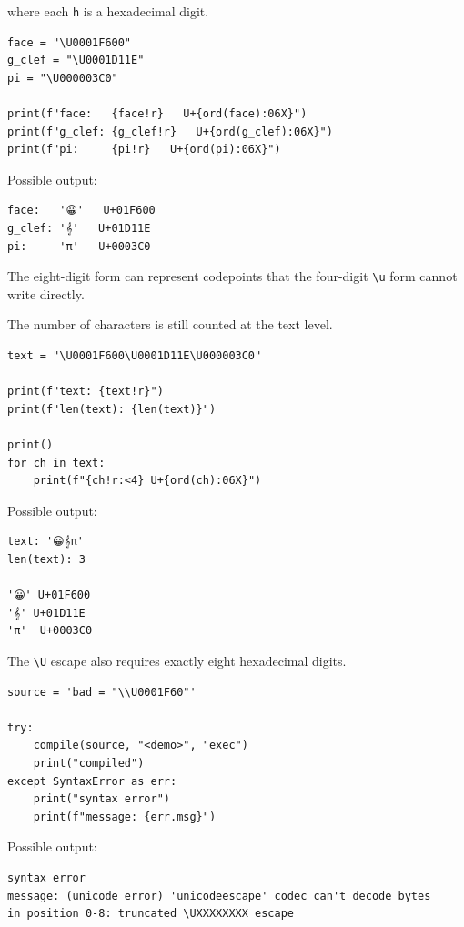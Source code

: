where each \texttt{h} is a hexadecimal digit.

\begin{verbatim}
face = "\U0001F600"
g_clef = "\U0001D11E"
pi = "\U000003C0"

print(f"face:   {face!r}   U+{ord(face):06X}")
print(f"g_clef: {g_clef!r}   U+{ord(g_clef):06X}")
print(f"pi:     {pi!r}   U+{ord(pi):06X}")
\end{verbatim}

Possible output:

\begin{verbatim}
face:   '😀'   U+01F600
g_clef: '𝄞'   U+01D11E
pi:     'π'   U+0003C0
\end{verbatim}

The eight-digit form can represent codepoints that the four-digit \texttt{\textbackslash u} form cannot write directly.

The number of characters is still counted at the text level.

\begin{verbatim}
text = "\U0001F600\U0001D11E\U000003C0"

print(f"text: {text!r}")
print(f"len(text): {len(text)}")

print()
for ch in text:
    print(f"{ch!r:<4} U+{ord(ch):06X}")
\end{verbatim}

Possible output:

\begin{verbatim}
text: '😀𝄞π'
len(text): 3

'😀' U+01F600
'𝄞' U+01D11E
'π'  U+0003C0
\end{verbatim}

The \texttt{\textbackslash U} escape also requires exactly eight hexadecimal digits.

\begin{verbatim}
source = 'bad = "\\U0001F60"'

try:
    compile(source, "<demo>", "exec")
    print("compiled")
except SyntaxError as err:
    print("syntax error")
    print(f"message: {err.msg}")
\end{verbatim}

Possible output:

\begin{verbatim}
syntax error
message: (unicode error) 'unicodeescape' codec can't decode bytes
in position 0-8: truncated \UXXXXXXXX escape
\end{verbatim}

